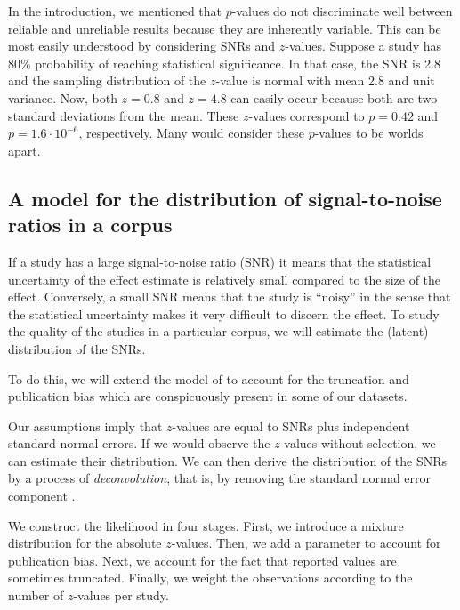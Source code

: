 \documentclass[11pt]{article}
\begin{document}
In the introduction, we mentioned that $p$-values do not discriminate well between reliable and unreliable results because they are inherently variable. This can be most easily understood by considering SNRs and $z$-values. Suppose a study has 80\% probability of reaching statistical significance. In that case, the SNR is 2.8 and the sampling distribution of the $z$-value is normal with mean 2.8 and unit variance. Now, both $z=0.8$ and $z=4.8$ can easily occur because both are two standard deviations from the mean. These $z$-values correspond to $p=0.42$ and $p=1.6 \cdot 10^{-6}$, respectively. Many would consider these $p$-values to be worlds apart.

\subsection{A model for the distribution of signal-to-noise ratios in a corpus}

If a study has a large signal-to-noise ratio (SNR) it means that the statistical uncertainty of the effect estimate is relatively small compared to the size of the effect. Conversely, a small SNR means that the study is ``noisy'' in the sense that the statistical uncertainty makes it very difficult to discern the effect. To study the quality of the studies in a particular corpus, we will estimate the (latent) distribution of the SNRs.  

To do this, we will extend the model of \textcite{stephens2017false,van2021statistical,zwet2022proposal} to account for the truncation and publication bias which are conspicuously present in some of our datasets. 

Our assumptions imply that $z$-values are equal to SNRs plus independent standard normal errors. If we would observe the $z$-values without selection, we can estimate their distribution. We can then derive the distribution of the SNRs by a process of \emph{deconvolution}, that is, by removing the standard normal error component \parencite{efron2016empirical,stephens2017false}. 

We construct the likelihood in four stages. First, we introduce a mixture distribution for the absolute $z$-values. Then, we add a parameter to account for publication bias. Next, we account for the fact that reported values are sometimes truncated. Finally, we weight the observations according to the number of $z$-values per study.
\end{document}
